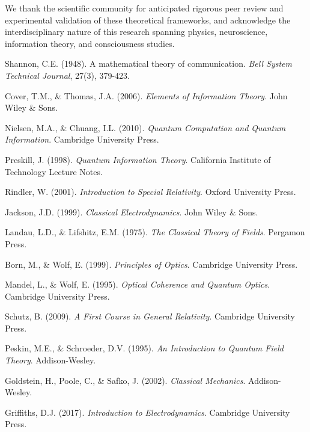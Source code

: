 \documentclass[12pt,a4paper]{article}
\begin{document}
We thank the scientific community for anticipated rigorous peer review and experimental validation of these theoretical frameworks, and acknowledge the interdisciplinary nature of this research spanning physics, neuroscience, information theory, and consciousness studies.


\begin{thebibliography}{99}

Shannon, C.E. (1948). A mathematical theory of communication. \textit{Bell System Technical Journal}, 27(3), 379-423.

Cover, T.M., \& Thomas, J.A. (2006). \textit{Elements of Information Theory}. John Wiley \& Sons.

Nielsen, M.A., \& Chuang, I.L. (2010). \textit{Quantum Computation and Quantum Information}. Cambridge University Press.

Preskill, J. (1998). \textit{Quantum Information Theory}. California Institute of Technology Lecture Notes.

Rindler, W. (2001). \textit{Introduction to Special Relativity}. Oxford University Press.

Jackson, J.D. (1999). \textit{Classical Electrodynamics}. John Wiley \& Sons.

Landau, L.D., \& Lifshitz, E.M. (1975). \textit{The Classical Theory of Fields}. Pergamon Press.

Born, M., \& Wolf, E. (1999). \textit{Principles of Optics}. Cambridge University Press.

Mandel, L., \& Wolf, E. (1995). \textit{Optical Coherence and Quantum Optics}. Cambridge University Press.

Schutz, B. (2009). \textit{A First Course in General Relativity}. Cambridge University Press.

Peskin, M.E., \& Schroeder, D.V. (1995). \textit{An Introduction to Quantum Field Theory}. Addison-Wesley.

Goldstein, H., Poole, C., \& Safko, J. (2002). \textit{Classical Mechanics}. Addison-Wesley.

Griffiths, D.J. (2017). \textit{Introduction to Electrodynamics}. Cambridge University Press.


\end{thebibliography}
\end{document}
